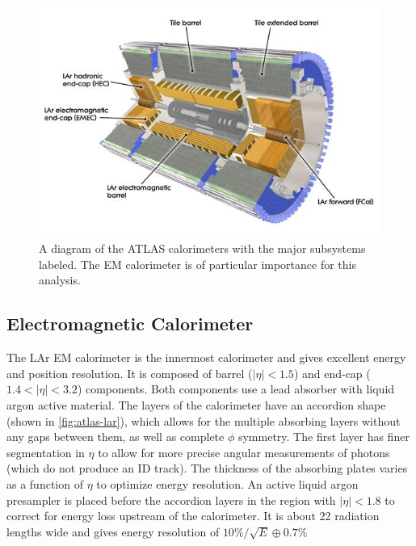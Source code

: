 \begin{figure}[htbp]
\centering
\includegraphics[width=.8\textwidth]{figures/Detector/atlas-calorimeters.jpg}
\caption{A diagram of the \ac{ATLAS} calorimeters with the major subsystems labeled. The \ac{EM} calorimeter is of particular importance for this analysis. \cite{calorimeters}}
\label{fig:atlas-calos}
\end{figure}


\subsection{Electromagnetic Calorimeter}

The \ac{LAr} \ac{EM} calorimeter is the innermost calorimeter and gives excellent energy and position resolution. \cite{calorimeters} It is composed of barrel ($|\eta| < 1.5$) and end-cap ($1.4 < |\eta| < 3.2$) components. Both components use a lead absorber with liquid argon active material. The layers of the calorimeter have an accordion shape (shown in \autoref{fig:atlas-lar}), which allows for the multiple absorbing layers without any gaps between them, as well as complete $\phi$ symmetry. The first layer has finer segmentation in $\eta$ to allow for more precise angular measurements of photons (which do not produce an \ac{ID} track). The thickness of the absorbing plates varies as a function of $\eta$ to optimize energy resolution. An active liquid argon presampler is placed before the accordion layers in the region with $|\eta| < 1.8$ to correct for energy loss upstream of the calorimeter. It is about 22 radiation lengths wide and gives energy resolution of $10\%/\sqrt{E} \oplus 0.7\%$


